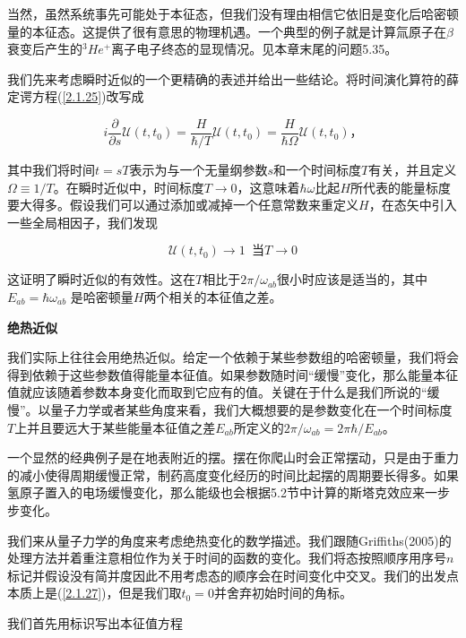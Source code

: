 ﻿\documentclass[UTF8,twoside]{ctexart}
\begin{document}
当然，虽然系统事先可能处于本征态，但我们没有理由相信它依旧是变化后哈密顿量的本征态。这提供了很有意思的物理机遇。一个典型的例子就是计算氚原子在$\beta$衰变后产生的$^3He^+$离子电子终态的显现情况。见本章末尾的问题5.35。

我们先来考虑瞬时近似的一个更精确的表述并给出一些结论。将时间演化算符的薛定谔方程(\ref{2.1.25})改写成

\begin{equation} \label{5.6.1}
i\dfrac{\partial}{\partial s}\mathcal{U}(t,t_0)=\dfrac{H}{\hbar/T}\mathcal{U}(t,t_0)=\dfrac{H}{\hbar\Omega}\mathcal{U}(t,t_0)\text{，}
\end{equation}

\noindent 其中我们将时间$t=sT$表示为与一个无量纲参数$s$和一个时间标度$T$有关，并且定义$\Omega\equiv1/T$。在瞬时近似中，时间标度$T\rightarrow0$，这意味着$\hbar\omega$比起$H$所代表的能量标度要大得多。假设我们可以通过添加或减掉一个任意常数来重定义$H$，在态矢中引入一些全局相因子，我们发现

\begin{equation} \label{5.6.2}
\mathcal{U}(t,t_0)\rightarrow1 \phantom{a}\text{当}T\rightarrow0
\end{equation}

\noindent 这证明了瞬时近似的有效性。这在$T$相比于$2\pi/\omega_{ab}$很小时应该是适当的，其中$E_{ab}=\hbar\omega_{ab}$ 是哈密顿量$H$两个相关的本征值之差。

\noindent \textbf{绝热近似}

\noindent 我们实际上往往会用绝热近似。给定一个依赖于某些参数组的哈密顿量，我们将会得到依赖于这些参数值得能量本征值。如果参数随时间“缓慢”变化，那么能量本征值就应该随着参数本身变化而取到它应有的值。关键在于什么是我们所说的“缓慢”。以量子力学或者某些角度来看，我们大概想要的是参数变化在一个时间标度$T$上并且要远大于某些能量本征值之差$E_{ab}$所定义的$2\pi/\omega_{ab}=2\pi\hbar/E_{ab}$。

一个显然的经典例子是在地表附近的摆。摆在你爬山时会正常摆动，只是由于重力的减小使得周期缓慢正常，制药高度变化经历的时间比起摆的周期要长得多。如果氢原子置入的电场缓慢变化，那么能级也会根据5.2节中计算的斯塔克效应来一步步变化。

我们来从量子力学的角度来考虑绝热变化的数学描述。我们跟随Griffiths(2005)的处理方法并着重注意相位作为关于时间的函数的变化。我们将态按照顺序用序号$n$标记并假设没有简并度因此不用考虑态的顺序会在时间变化中交叉。我们的出发点本质上是(\ref{2.1.27})，但是我们取$t_0=0$并舍弃初始时间的角标。

我们首先用标识写出本征值方程
\end{document}
